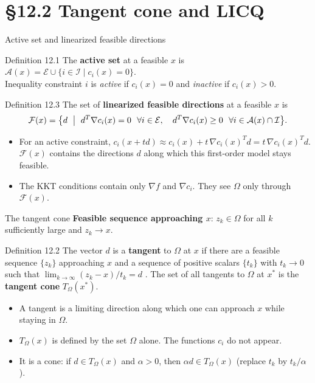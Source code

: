 \documentclass[aspectratio=169,12pt]{beamer}
\newcommand{\xs}{x^{*}}
\newcommand{\gradf}{\nabla f}
\newcommand{\eqn}[1]{\text{\small(#1)}}
\newcommand{\cA}{\mathcal{A}}
\newcommand{\cE}{\mathcal{E}}
\newcommand{\cF}{\mathcal{F}}
\newcommand{\cI}{\mathcal{I}}
\newcommand{\TO}{T_{\Omega}}
\begin{document}
\section{\S12.2 Tangent cone and LICQ}

\begin{frame}{Active set and linearized feasible directions}
  \begin{block}{Definition 12.1}
    The \textbf{active set} at a feasible $x$ is
    $\cA(x)=\cE\cup\{i\in\cI\mid c_{i}(x)=0\}$.\\
    Inequality constraint $i$ is \emph{active} if $c_{i}(x)=0$ and \emph{inactive} if $c_{i}(x)>0$.
  \end{block}
  \begin{block}{Definition 12.3}
    The set of \textbf{linearized feasible directions} at a feasible $x$ is
    \[ \cF(x)=\bigl\{d\ \bigm|\ d^{T}\nabla c_{i}(x)=0\ \ \forall i\in\cE,\quad
       d^{T}\nabla c_{i}(x)\ge 0\ \ \forall i\in\cA(x)\cap\cI\bigr\} . \]
  \end{block}
  \begin{itemize}\setlength\itemsep{0.3em}
    \item For an active constraint, $c_{i}(x+td)\approx c_{i}(x)+t\,\nabla c_{i}(x)^{T}d=t\,\nabla c_{i}(x)^{T}d$.
      $\cF(x)$ contains the directions $d$ along which this first-order model stays feasible.
    \item The KKT conditions contain only $\gradf$ and $\nabla c_{i}$. They see $\Omega$ only through $\cF(x)$.
  \end{itemize}
\end{frame}

\begin{frame}{The tangent cone}
  \textbf{Feasible sequence approaching $x$}: $z_{k}\in\Omega$ for all $k$ sufficiently large and $z_{k}\to x$.
  \begin{block}{Definition 12.2}
    The vector $d$ is a \textbf{tangent} to $\Omega$ at $x$ if there are a feasible sequence $\{z_{k}\}$
    approaching $x$ and a sequence of positive scalars $\{t_{k}\}$ with $t_{k}\to 0$ such that
    $\lim_{k\to\infty}(z_{k}-x)/t_{k}=d$ \eqn{12.29}.
    The set of all tangents to $\Omega$ at $\xs$ is the \textbf{tangent cone} $\TO(\xs)$.
  \end{block}
  \begin{itemize}\setlength\itemsep{0.4em}
    \item A tangent is a limiting direction along which one can approach $x$ while staying in $\Omega$.
    \item $\TO(x)$ is defined by the set $\Omega$ alone. The functions $c_{i}$ do not appear.
    \item It is a cone: if $d\in\TO(x)$ and $\alpha>0$, then $\alpha d\in\TO(x)$ (replace $t_{k}$ by $t_{k}/\alpha$).
  \end{itemize}
\end{frame}
\end{document}
